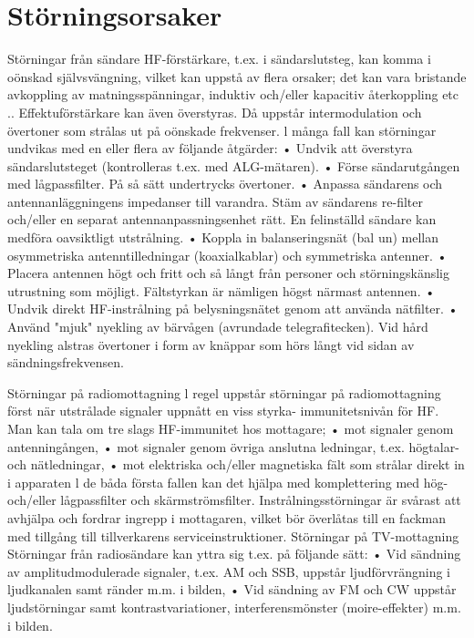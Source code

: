 \section{Störningsorsaker}

Störningar från sändare
HF-förstärkare, t.ex. i sändarslutsteg, kan
komma i oönskad självsvängning, vilket kan
uppstå av flera orsaker; det kan vara bristande avkoppling av matningsspänningar, induktiv och/eller kapacitiv återkoppling etc ..
Effektuförstärkare kan även överstyras.
Då uppstår intermodulation och övertoner
som strålas ut på oönskade frekvenser.
l många fall kan störningar undvikas med
en eller flera av följande åtgärder:
• Undvik att överstyra sändarslutsteget
(kontrolleras t.ex. med ALG-mätaren).
• Förse sändarutgången med lågpassfilter.
På så sätt undertrycks övertoner.
• Anpassa sändarens och antennanläggningens impedanser till varandra. Stäm
av sändarens re-filter och/eller en separat
antennanpassningsenhet rätt. En felinställd sändare kan medföra oavsiktligt
utstrålning.
• Koppla in balanseringsnät (bal un) mellan
osymmetriska antenntilledningar (koaxialkablar) och symmetriska antenner.
• Placera antennen högt och fritt och så
långt från personer och störningskänslig
utrustning som möjligt. Fältstyrkan är
nämligen högst närmast antennen.
• Undvik direkt HF-instrålning på belysningsnätet genom att använda nätfilter.
• Använd "mjuk" nyekling av bärvågen (avrundade telegrafitecken). Vid hård nyekling alstras övertoner i form av knäppar
som hörs långt vid sidan av sändningsfrekvensen.

Störningar på radiomottagning
l regel uppstår störningar på radiomottagning
först när utstrålade signaler uppnått en viss
styrka- immunitetsnivån för HF.
Man kan tala om tre slags HF-immunitet
hos mottagare;
• mot signaler genom antenningången,
• mot signaler genom övriga anslutna ledningar, t.ex. högtalar- och nätledningar,
• mot elektriska och/eller magnetiska fält
som strålar direkt in i apparaten
l de båda första fallen kan det hjälpa med
komplettering med hög- och/eller lågpassfilter och skärmströmsfilter.
Instrålningsstörningar är svårast att avhjälpa och fordrar ingrepp i mottagaren, vilket bör överlåtas till en fackman med tillgång
till tillverkarens serviceinstruktioner.
Störningar på TV-mottagning
Störningar från radiosändare kan yttra sig
t.ex. på följande sätt:
• Vid sändning av amplitudmodulerade signaler, t.ex. AM och SSB, uppstår ljudförvrängning i ljudkanalen samt ränder
m.m. i bilden,
• Vid sändning av FM och CW uppstår ljudstörningar samt kontrastvariationer, interferensmönster (moire-effekter) m.m. i
bilden.


